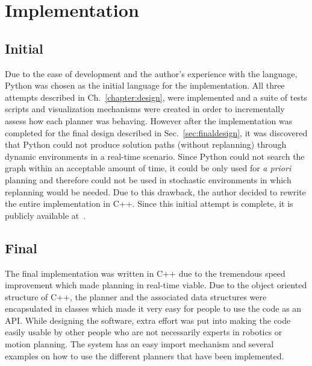 


\chapter{Implementation}

\label{chapter:Implementation}

\section{Initial}

Due to the ease of development and the author's experience with the language,
Python was chosen as the initial language for the implementation. All three
attempts described in Ch.~\ref{chapter:design}, were implemented and a suite of
tests scripts and visualization mechanisms were created in order to
incrementally assess how each planner was behaving. However after the
implementation was completed for the final design described in
Sec.~\ref{sec:finaldesign}, it was discovered that Python could not produce
solution paths (without replanning) through dynamic environments in a real-time
scenario. Since Python could not search the graph within an acceptable amount
of time, it could be only used for \emph{a priori} planning and therefore could
not be used in stochastic environments in which replanning would be needed. Due
to this drawback, the author decided to rewrite the entire implementation in
C++. Since this initial attempt is complete, it is publicly available
at~\cite{racer}.

\section{Final}

The final implementation was written in C++ due to the tremendous speed
improvement which made planning in real-time viable. Due to the object oriented
structure of C++, the planner and the associated data structures were
encapsulated in classes which made it very easy for people to use the code as
an API. While designing the software, extra effort was put into making the code
easily usable by other people who are not necessarily experts in robotics or
motion planning.  The system has an easy import mechanism and several examples
on how to use the different planners that have been implemented.

